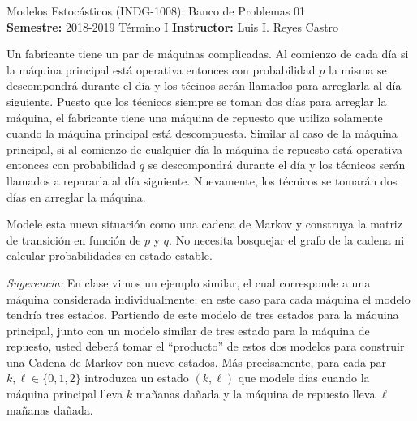\documentclass[ a4paper, twoside, 11pt]{article}
\newcommand{\numero}{01}
\begin{document}
\allowdisplaybreaks



\begin{center}
\Large Modelos Estoc\'asticos (INDG-1008): Banco de Problemas \numero \\[1ex]
\small \textbf{Semestre:} 2018-2019 T\'ermino I \qquad
\textbf{Instructor:} Luis I. Reyes Castro
\end{center}
\fullskip

\begin{problem}

Un fabricante tiene un par de m\'aquinas complicadas. Al comienzo de cada d\'ia si la m\'aquina principal est\'a operativa entonces con probabilidad $p$ la misma se descompondr\'a durante el d\'ia y los t\'ecinos ser\'an llamados para arreglarla al d\'ia siguiente. Puesto que los t\'ecnicos siempre se toman dos d\'ias para arreglar la m\'aquina, el fabricante tiene una m\'aquina de repuesto que utiliza solamente cuando la m\'aquina principal est\'a descompuesta. Similar al caso de la m\'aquina principal, si al comienzo de cualquier d\'ia la m\'aquina de repuesto est\'a operativa entonces con probabilidad $q$ se descompondr\'a durante el d\'ia y los t\'ecnicos ser\'an llamados a repararla al d\'ia siguiente. Nuevamente, los t\'ecnicos se tomar\'an dos d\'ias en arreglar la m\'aquina. 

Modele esta nueva situaci\'on como una cadena de Markov y construya la matriz de transici\'on en funci\'on de $p$ y $q$. No necesita bosquejar el grafo de la cadena ni calcular probabilidades en estado estable. 

\emph{Sugerencia:} En clase vimos un ejemplo similar, el cual corresponde a una m\'aquina considerada individualmente; en este caso para cada m\'aquina el modelo tendr\'ia tres estados. Partiendo de este modelo de tres estados para la m\'aquina principal, junto con un modelo similar de tres estado para la m\'aquina de repuesto, usted deber\'a tomar el ``producto'' de estos dos modelos para construir una Cadena de Markov con nueve estados. M\'as precisamente, para cada par $k, \ell \in \{ 0, 1, 2 \}$ introduzca un estado $( k, \ell)$ que modele d\'ias cuando la m\'aquina principal lleva $k$ ma\~nanas da\~nada y la m\'aquina de repuesto lleva $\ell$ ma\~nanas da\~nada. 

\end{problem}
\fullskip
\end{document}

